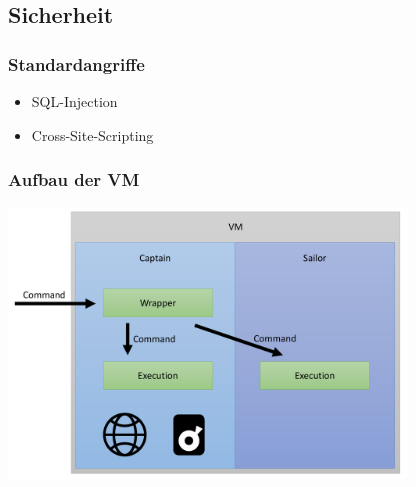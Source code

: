 \subsection{Sicherheit}

\begin{frame}
\frametitle{Standardangriffe}
\begin{itemize}
\item SQL-Injection
\item Cross-Site-Scripting
\end{itemize}
\end{frame}

\begin{frame}
\frametitle{Aufbau der VM}
\includegraphics[width=300pt]{security/user.pdf}
\end{frame}